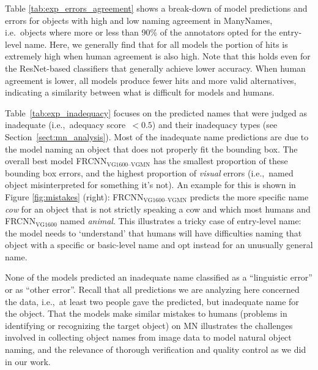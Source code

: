 Table \ref{tab:exp_errors_agreement} shows a break-down of model predictions and errors for objects with high and low naming agreement in ManyNames, i.e.\ objects where more or less than 90\% of the annotators opted for the entry-level name. 
Here, we generally find that for all models the portion of hits is extremely high when human agreement is also high.
Note that this holds even for the ResNet-based classifiers that generally achieve lower accuracy.
When human agreement is lower, all models produce fewer hits and more valid alternatives, indicating a similarity between what is difficult for models and humans.

Table~\ref{tab:exp_inadequacy} focuses on the predicted \mn names that were judged as inadequate (i.e.,~adequacy score~\mbox{$<0.5$}) and their inadequacy types (see Section~\ref{sect:mn_analysis}).
Most of the inadequate name predictions are due to the model naming an object that does not properly fit the bounding box. 
The overall best model FRCNN$_{\text{VG1600--VGMN}}$ has the smallest proportion of these bounding box errors, and the highest proportion of \textit{visual} errors (i.e.,~named object misinterpreted for something it's not). 
An example for this is shown in Figure \ref{fig:mistakes} (right): FRCNN$_{\text{VG1600--VGMN}}$ predicts the more specific name \textit{cow} for an object that is not strictly speaking a cow and which most humans and FRCNN$_{\text{VG1600}}$ named \textit{animal}.
This illustrates a tricky case of entry-level name: the model needs to `understand' that humans will have difficulties naming that object with a specific or basic-level name and opt instead for an unusually general name.

%
None of the models predicted an inadequate name classified as a ``linguistic error'' or as ``other error''.
Recall that all predictions we are analyzing here concerned the \mn data, i.e.,~at least two people gave the predicted, but inadequate name for the object. 
That the models make similar mistakes to humans (problems in identifying or recognizing the target object) on MN illustrates the challenges involved in collecting object names from image data to model natural object naming, and the relevance of thorough verification and quality control as we did in our work.  


